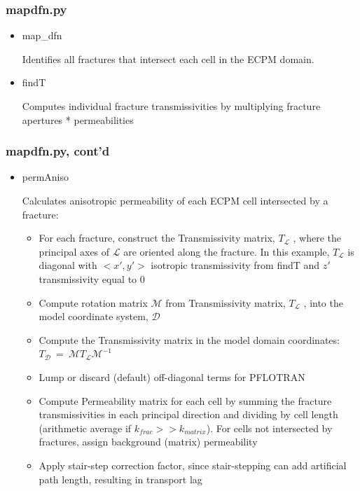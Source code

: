 \documentclass{beamer}
\newcommand{\eq}{\ =\ }
\def\gD{\mathcal D}
\def\M{\mathcal M}
\def\L{\mathcal L}
\newcommand\magentacomment[1]{{{\color{magenta} #1}}}
\begin{document}
\begin{frame} \frametitle{mapdfn.py}
	\begin{itemize}
		\item \begin{semiverbatim}\magentacomment{map_dfn}\end{semiverbatim} Identifies all fractures that intersect each cell in the ECPM domain. 
		\item \begin{semiverbatim}\magentacomment{findT}\end{semiverbatim}  Computes individual fracture transmissivities by multiplying fracture apertures * permeabilities
	\end{itemize}
	
\end{frame}

\begin{frame} \frametitle{mapdfn.py, cont'd}
	\begin{itemize}
		\item \begin{semiverbatim}\magentacomment{permAniso}\end{semiverbatim} Calculates anisotropic permeability of each ECPM cell intersected by a fracture:
		\begin{itemize}
			\item For each fracture, construct the Transmissivity matrix, $T_{\L}$ , where the principal axes of $\L$ are oriented along the fracture. In this example, $T_{\L}$ is diagonal with $<x',y'>$ isotropic transmissivity from \magentacomment{findT} and $z'$ transmissivity equal to 0
			\item Compute rotation matrix $\M$ from Transmissivity matrix, $T_{\L}$ , into the model coordinate system, $\gD$
			\item Compute the Transmissivity matrix in the model domain coordinates: $T_{\gD} \eq \M  T_{\L} \M^{-1}$ 
			\item Lump or discard (default) off-diagonal terms for PFLOTRAN
			\item Compute Permeability matrix for each cell by summing the fracture transmissivities in each principal direction and dividing by cell length (arithmetic average if $k_{frac} >> k_{matrix}$). For cells not intersected by fractures, assign background (matrix) permeability
			\item Apply stair-step correction factor, since stair-stepping can add artificial path length, resulting in transport lag
		\end{itemize}
	\end{itemize}
	
\end{frame}
\end{document}
